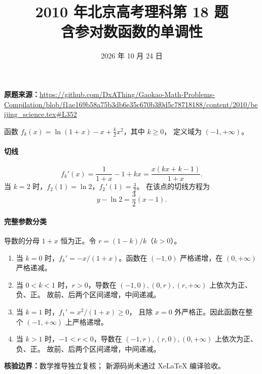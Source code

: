 \documentclass[UTF8,a4paper,11pt]{ctexart}
\title{2010 年北京高考理科第 18 题\\含参对数函数的单调性}
\date{2026 年 10 月 24 日}
\begin{document}
\maketitle
\noindent\textbf{原题来源：}\url{https://github.com/DxAThing/Gaokao-Math-Problems-Compilation/blob/f1ae169b58a75b3db6e35c670b3f0d5c78718188/content/2010/beijing_science.tex#L352}
\par
函数 $f_k(x)=\ln(1+x)-x+\frac{k}{2}x^2$，其中 $k\ge0$，
定义域为 $(-1,+\infty)$。

\paragraph{切线}
\[
 f_k'(x)=\frac1{1+x}-1+kx
        =\frac{x(kx+k-1)}{1+x}.
\]
当 $k=2$ 时，$f_2(1)=\ln2$，$f_2'(1)=\frac32$。
在该点的切线方程为
\[
 \boxed{y-\ln2=\frac32(x-1)}.
\]

\paragraph{完整参数分类}
导数的分母 $1+x$ 恒为正。令 $r=(1-k)/k$（$k>0$）。
\begin{enumerate}
\item 当 $k=0$ 时，$f_k'=-x/(1+x)$。函数在
$(-1,0)$ 严格递增，在 $(0,+\infty)$ 严格递减。
\item 当 $0<k<1$ 时，$r>0$，导数在
$(-1,0),(0,r),(r,+\infty)$ 上依次为正、负、正。
故前、后两个区间递增，中间递减。
\item 当 $k=1$ 时，$f_1'=x^2/(1+x)\ge0$，
且除 $x=0$ 外严格正。因此函数在整个
$(-1,+\infty)$ 上严格递增。
\item 当 $k>1$ 时，$-1<r<0$，导数在
$(-1,r),(r,0),(0,+\infty)$ 上依次为正、负、正。
故前、后两个区间递增，中间递减。
\end{enumerate}

\noindent\textbf{核验边界：}数学推导独立复核；
新源码尚未通过 XeLaTeX 编译验收。
\end{document}
